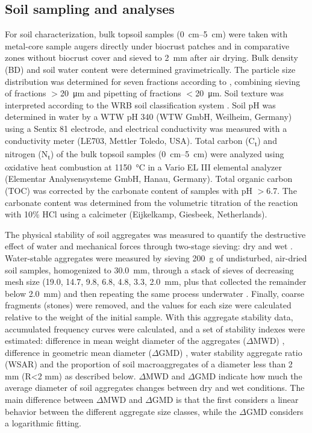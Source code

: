 \FloatBarrier

\subsection{Soil sampling and analyses}

For soil characterization, bulk topsoil samples (\SIrange[range-phrase=--,range-units=single]{0}{5}{\centi\meter}) were taken with metal-core sample augers directly under biocrust patches and in comparative zones without biocrust cover and sieved to \SI{2}{\milli\meter} after air drying. Bulk density (BD) and soil water content were determined gravimetrically. The particle size distribution was determined for seven fractions according to \citet{Kohn1929}, combining sieving of fractions $>$\SI{20}{\micro\meter} and pipetting of fractions $<$\SI{20}{\micro\meter}. Soil texture was interpreted according to the WRB soil classification system \citep{Jahn2006}. Soil pH was determined in water by a WTW pH 340 (WTW GmbH, Weilheim, Germany) using a Sentix 81 electrode, and electrical conductivity was measured with a conductivity meter (LE703, Mettler Toledo, USA). Total carbon (C\textsubscript{t}) and nitrogen (N\textsubscript{t}) of the bulk topsoil samples (\SIrange[range-phrase=--,range-units=single]{0}{5}{\centi\meter}) were analyzed using oxidative heat combustion at \SI{1150}{\degreeCelsius} in a Vario EL III elemental analyzer (Elementar Analysensysteme GmbH, Hanau, Germany). Total organic carbon (TOC) was corrected by the carbonate content of samples with pH $>$6.7. The carbonate content was determined from the volumetric titration of the reaction with 10\% HCl using a calcimeter (Eijkelkamp, Giesbeek, Netherlands).

The physical stability of soil aggregates was measured to quantify the destructive effect of water and mechanical forces through two-stage sieving: dry and wet \citep{Hartge2009}. Water-stable aggregates were measured by sieving \SI{200}{\gram} of undisturbed, air-dried soil samples, homogenized to \SI{30.0}{\milli\meter}, through a stack of sieves of decreasing mesh size (19.0, 14.7, 9.8, 6.8, 4.8, 3.3, \SI{2.0}{\milli\meter}, plus that collected the remainder below \SI{2.0}{\milli\meter}) and then repeating the same process underwater \citep{Six2000}. Finally, coarse fragments (stones) were removed, and the values for each size were calculated relative to the weight of the initial sample. With this aggregate stability data, accumulated frequency curves were calculated, and a set of stability indexes were estimated: difference in mean weight diameter of the aggregates ($\Delta$MWD) \citep{Hartge2009,Bavel1950,LoaizaPuerta2018}, difference in geometric mean diameter ($\Delta$GMD) \citep{Mazurak1950,Kemper1986}, water stability aggregate ratio (WSAR) \citep{Liu2014} and the proportion of soil macroaggregates of a diameter less than 2 mm (R<2 mm) \citep{Liang2015} as described below. $\Delta$MWD and $\Delta$GMD indicate how much the average diameter of soil aggregates changes between dry and wet conditions. The main difference between $\Delta$MWD and $\Delta$GMD is that the first considers a linear behavior between the different aggregate size classes, while the $\Delta$GMD considers a logarithmic fitting.

